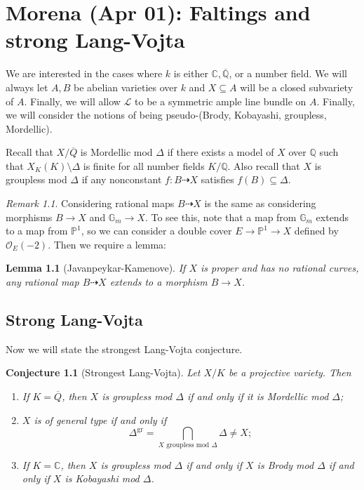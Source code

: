 \documentclass[leqno, openany]{memoir}
\newtheorem{lem}[thm]{Lemma}
\newtheorem{conj}[thm]{Conjecture}
\theoremstyle{definition}
\theoremstyle{remark}
\newtheorem{rmk}[thm]{Remark}
\theoremstyle{plain}
\theoremstyle{definition}
\theoremstyle{remark}
\newcommand{\C}{\mathbb{C}}
\newcommand{\Q}{\mathbb{Q}}
\renewcommand{\P}{\mathbb{P}}
\newcommand{\mc}[1]{\mathcal{#1}}
\newcommand{\mr}[1]{\mathrm{#1}}
\newcommand{\ol}[1]{\overline{#1}}
\begin{document}
\chapter{Morena (Apr 01): Faltings and strong Lang-Vojta}%

We are interested in the cases where $k$ is either $\C, \ol{\Q}$, or a number field. We will always let $A, B$ be abelian varieties over $k$ and $X \subseteq A$ will be a closed subvariety of $A$. Finally, we will allow $\mc{L}$ to be a symmetric ample line bundle on $A$. Finally, we will consider the notions of being pseudo-(Brody, Kobayashi, groupless, Mordellic).

Recall that $X/\ol{Q}$ is Mordellic mod $\Delta$ if there exists a model of $X$ over $\Q$ such that $X_K(K) \setminus \Delta$ is finite for all number fields $K/\Q$. Also recall that $X$ is groupless mod $\Delta$ if any nonconstant $f \colon B \dashrightarrow X$ satisfies $f(B) \subseteq \Delta$.

\begin{rmk}
    Considering rational maps $B \dashrightarrow X$ is the same as considering morphisms $B \to X$ and $\mathbb{G}_m \to X$. To see this, note that a map from $\mathbb{G}_m$ extends to a map from $\P^1$, so we can consider a double cover $E \to \P^1 \to X$ defined by $\mc{O}_E(-2)$. Then we require a lemma:
\end{rmk}

\begin{lem}[Javanpeykar-Kamenove]
    If $X$ is proper and has no rational curves, any rational map $B \dashrightarrow X$ extends to a morphism $B \to X$.
\end{lem}

\section{Strong Lang-Vojta}

Now we will state the strongest Lang-Vojta conjecture.

\begin{conj}[Strongest Lang-Vojta]
    Let $X/K$ be a projective variety. Then
    \begin{enumerate}[(1)]
        \item If $K = \ol{Q}$, then $X$ is groupless mod $\Delta$ if and only if it is Mordellic mod $\Delta$;
        \item $X$ is of general type if and only if
            \[ \Delta^{\mr{gr}} = \bigcap_{X \text{ groupless mod }\Delta} \Delta \neq X; \]
        \item If $K = \C$, then $X$ is groupless mod $\Delta$ if and only if $X$ is Brody mod $\Delta$ if and only if $X$ is Kobayashi mod $\Delta$.
    \end{enumerate}
\end{conj}
\end{document}
